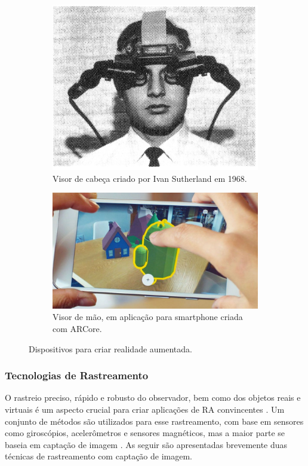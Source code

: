 \begin{figure}[h]
    \centering
    \begin{subfigure}{.33\textwidth}
        \centering
        \includegraphics[width=.9\linewidth,fbox]{figs/ivan_sutherland_device.png}
        \caption{Visor de cabeça criado por Ivan Sutherland em 1968.}
        \label{fig_ivan_sutherland}
    \end{subfigure}%
    \begin{subfigure}{.55\textwidth}
        \centering
        \includegraphics[width=.9\linewidth,fbox]{figs/arcore.jpg}
        \caption{Visor de mão, em aplicação para smartphone criada com ARCore.}
        \label{fig_arcore}
    \end{subfigure}%
    \caption{Dispositivos para criar realidade aumentada.}
    \label{fig_ra_devices}
\end{figure}

\subsubsection{Tecnologias de Rastreamento}
\label{subsub_tracking}
O rastreio preciso, rápido e robusto do observador, bem como dos objetos reais e virtuais é um aspecto crucial para criar aplicações de RA convincentes \cite{bimber_spatial_2005}. Um conjunto de métodos são utilizados para esse rastreamento, com base em sensores como giroscópios, acelerômetros e sensores magnéticos, mas a maior parte se baseia em captação de imagem \cite{resch_enhancing_2016}. As seguir são apresentadas brevemente duas técnicas de rastreamento com captação de imagem.

